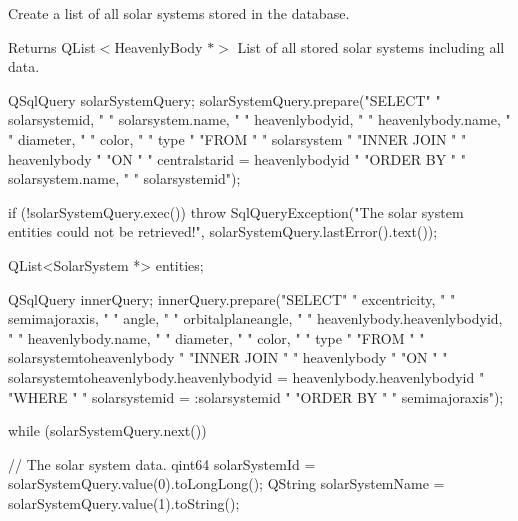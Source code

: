 \-Create a list of all solar systems stored in the database. 

\begin{DoxyReturn}{\-Returns}
\-Q\-List$<$\-Heavenly\-Body $\ast$$>$ \-List of all stored solar systems including all data. 
\end{DoxyReturn}

\begin{DoxyCode}
{
    QSqlQuery solarSystemQuery;
    solarSystemQuery.prepare("SELECT"
                             "     solarsystemid, "
                             "     solarsystem.name, "
                             "     heavenlybodyid, "
                             "     heavenlybody.name, "
                             "     diameter, "
                             "     color, "
                             "     type "
                             "FROM "
                             "     solarsystem "
                             "INNER JOIN "
                             "     heavenlybody "
                             "ON "
                             "     centralstarid = heavenlybodyid "
                             "ORDER BY "
                             "     solarsystem.name, "
                             "     solarsystemid");

    if (!solarSystemQuery.exec())
    {
        throw SqlQueryException("The solar system entities could not be
       retrieved!",
                                solarSystemQuery.lastError().text());
    }

    QList<SolarSystem *> entities;

    QSqlQuery innerQuery;
    innerQuery.prepare("SELECT"
                  "     excentricity, "
                  "     semimajoraxis, "
                  "     angle, "
                  "     orbitalplaneangle, "
                  "     heavenlybody.heavenlybodyid, "
                  "     heavenlybody.name, "
                  "     diameter, "
                  "     color, "
                  "     type "
                  "FROM "
                  "     solarsystemtoheavenlybody "
                  "INNER JOIN "
                  "     heavenlybody "
                  "ON "
                  "     solarsystemtoheavenlybody.heavenlybodyid =
       heavenlybody.heavenlybodyid "
                  "WHERE "
                  "     solarsystemid = :solarsystemid "
                  "ORDER BY "
                  "     semimajoraxis");

    while (solarSystemQuery.next())
    {
        // The solar system data.
        qint64 solarSystemId = solarSystemQuery.value(0).toLongLong();
        QString solarSystemName = solarSystemQuery.value(1).toString();

}}
\end{DoxyCode}
